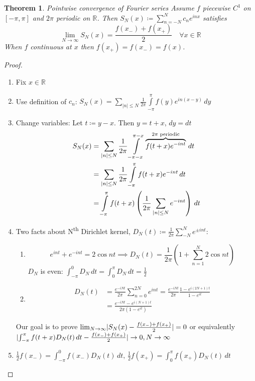 \documentclass{article}
\newtheorem{theorem}{Theorem}
\DeclarePairedDelimiter\abs{\lvert}{\rvert}
\begin{document}
\begin{theorem}{Pointwise convergence of Fourier series}
	Assume $f$ piecewise $C^1$ on $[-\pi, \pi]$ and $2\pi$ periodic on $\mathbb R$.
	Then $ S_N(x) \coloneqq \sum_{n = -N}^N c_n e^{inx} $ satisfies
	$$ \lim_{N \to \infty} S_N(x) = \frac{f(x_-) + f(x_+)}2 \quad \forall x \in \mathbb R $$
	When $f$ continuous at $x$ then $f(x_+) = f(x_-) = f(x)$.
\end{theorem}
\begin{proof}
	\begin{enumerate}
		\item Fix $x \in \mathbb R$
		\item Use definition of $c_n$:
			$ \displaystyle S_N(x) = \sum_{\lvert n \rvert \le N} \frac1{2\pi} \int\limits_{-\pi}^\pi f(y) e^{in (x - y)} \, dy $
		\item Change variables: Let $t \coloneqq y - x$. Then $y = t + x$, $dy = dt$
			\begin{align*}
				S_N(x) &= \sum_{\abs n \le N} \frac1{2\pi} \int\limits_{-\pi - x}^{\pi - x} \overbrace{f(t + x) e^{-int}}^{2\pi \text{ periodic}} \, dt \\
				&= \sum_{\abs n \le N} \frac1{2\pi} \int\limits_{-\pi}^{\pi} f(t + x) e^{-int} \, dt \\
				&= \int\limits_{-\pi}^{\pi} f(t + x) \left( \frac1{2\pi} \sum_{\abs n \le N} e^{-int} \right) \, dt
			\end{align*}
		\item Two facts about N\textsuperscript{th} Dirichlet kernel, $D_N(t) \coloneqq \frac1{2\pi} \sum_{-N}^N e^{\pm int}$:

			\begin{enumerate}
				\item $$ e^{int} + e^{-int} = 2 \cos nt \implies D_N(t) = \frac1{2\pi} \left(1 + \sum_{n = 1}^N 2\cos nt\right) $$
					$D_N$ is even: $\int_{-\pi}^0 D_N \, dt = \int_0^{\pi} D_N \, dt = \frac12$
				\item
					\begin{align*}
						D_N(t) &= \frac{e^{-iNt}}{2\pi} \sum_{n = 0}^{2N} e^{int} = \frac{e^{-iNt}}{2\pi} \frac{1 - e^{i(2N + 1)t}}{1 - e^{it}} \\
						&= \frac{e^{-iNt} - e^{i(N + 1)t}}{2\pi (1 - e^{it})}
					\end{align*}
			\end{enumerate}

			Our goal is to prove $\lim_{N \to \infty} \abs{S_N(x) - \frac{f(x_-) + f(x_+)}2} = 0$ or equivalently
			$\abs{\int_{-\pi}^\pi f(t + x) D_N(t) \, dt - \frac{f(x_-) + f(x_+)}2} \to 0, N \to \infty$
		\item $\frac12 f(x_-) = \int_{-\pi}^0 f(x_-) D_N(t) \, dt, \,
			\frac12 f(x_+) = \int_0^\pi f(x_+) D_N(t) \, dt$


\end{enumerate}
\end{proof}
\end{document}
